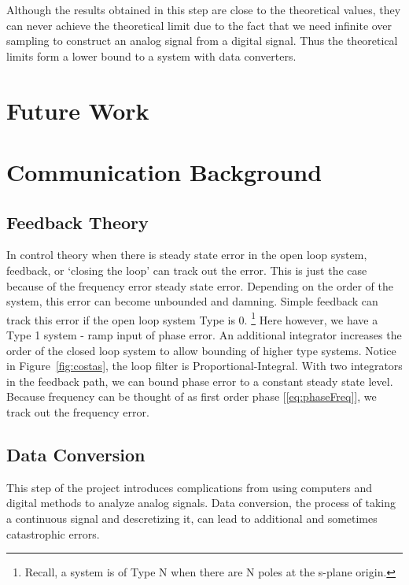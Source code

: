 \documentclass[]{article}
\begin{document}
Although the results obtained in this step are close to the theoretical values, they can never achieve the theoretical limit due to the fact that we need infinite over sampling to construct an analog signal from a digital signal. Thus the theoretical limits form a lower bound to a system with data converters. 

\section{Future Work}

\appendix
\newpage


\newpage
%

\section{Communication Background}

\subsection{Feedback Theory}
\label{sec:feedback}
In control theory when there is steady state error in the open loop system, feedback, or `closing the loop' can track out the error. This is just the case because of the frequency error steady state error.  Depending on the order of the system, this error can become unbounded and damning.  Simple feedback can track this error if the open loop system Type is 0.  \footnote{Recall, a system is of Type N when there are N poles at the s-plane origin.}  Here however, we have a Type 1 system - ramp input of phase error.  An additional integrator increases the order of the closed loop system to allow bounding of higher type systems. Notice in Figure~\ref{fig:costas}, the loop filter is Proportional-Integral.  With two integrators in the feedback path, we can bound phase error to a constant steady state level.  Because frequency can be thought of as first order phase [\ref{eq:phaseFreq}], we track out the frequency error.\\

\subsection{Data Conversion}
\label{sec:converter}
This step of the project introduces complications from using computers and digital methods to analyze analog signals.  Data conversion, the process of taking a continuous signal and descretizing it, can lead to additional and sometimes catastrophic errors.\\
\end{document}
